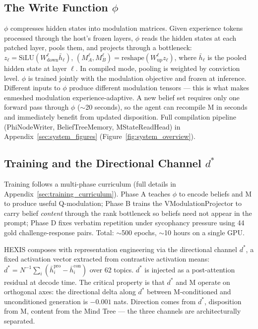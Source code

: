 \subsection{The Write Function $\phi$}
\label{sec:write_function}

$\phi$ compresses hidden states into modulation matrices. Given experience tokens processed through the host's frozen layers, $\phi$ reads the hidden states at each patched layer, pools them, and projects through a bottleneck: $z_\ell = \text{SiLU}(W_\text{down}^\ell \bar{h}_\ell)$, $(M_A^\ell, M_B^\ell) = \text{reshape}(W_\text{up}^\ell z_\ell)$, where $\bar h_\ell$ is the pooled hidden state at layer $\ell$. In compiled mode, pooling is weighted by conviction level. $\phi$ is trained jointly with the modulation objective and frozen at inference. Different inputs to $\phi$ produce different modulation tensors --- this is what makes enmeshed modulation experience-adaptive. A new belief set requires only one forward pass through $\phi$ ($\sim$20 seconds), so the agent can recompile M in seconds and immediately benefit from updated disposition. Full compilation pipeline (PhiNodeWriter, BeliefTreeMemory, MStateReadHead) in Appendix~\ref{sec:system_figures} (Figure~\ref{fig:system_overview}).

\subsection{Training and the Directional Channel $d^*$}
\label{sec:training}

Training follows a multi-phase curriculum (full details in Appendix~\ref{sec:training_curriculum}). Phase A teaches $\phi$ to encode beliefs and M to produce useful Q-modulation; Phase B trains the VModulationProjector to carry belief \emph{content} through the rank bottleneck so beliefs need not appear in the prompt; Phase D fixes verbatim repetition under sycophancy pressure using 44 gold challenge-response pairs. Total: $\sim$500 epochs, $\sim$10 hours on a single GPU.

HEXIS composes with representation engineering via the directional channel $d^*$, a fixed activation vector extracted from contrastive activation means: $d^* = N^{-1} \sum_i (\bar h_i^\text{pro} - \bar h_i^\text{con})$ over 62 topics. $d^*$ is injected as a post-attention residual at decode time. The critical property is that $d^*$ and M operate on orthogonal axes: the directional delta along $d^*$ between M-conditioned and unconditioned generation is $-0.001$ nats. Direction comes from $d^*$, disposition from M, content from the Mind Tree --- the three channels are architecturally separated.
